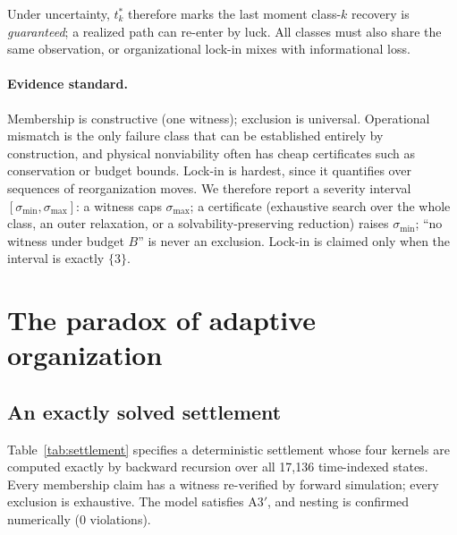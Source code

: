\documentclass[11pt]{article}
\theoremstyle{plain}
\theoremstyle{definition}
\begin{document}
Under uncertainty, $t^*_k$ therefore marks the last moment class-$k$ recovery is \emph{guaranteed}; a realized path can re-enter by luck. All classes must also share the same observation, or organizational lock-in mixes with informational loss.

\paragraph{Evidence standard.} Membership is constructive (one witness); exclusion is universal. Operational mismatch is the only failure class that can be established entirely by construction, and physical nonviability often has cheap certificates such as conservation or budget bounds. Lock-in is hardest, since it quantifies over sequences of reorganization moves. We therefore report a severity interval $[\sigma_{\min},\sigma_{\max}]$: a witness caps $\sigma_{\max}$; a certificate (exhaustive search over the whole class, an outer relaxation, or a solvability-preserving reduction) raises $\sigma_{\min}$; ``no witness under budget $B$'' is never an exclusion. Lock-in is claimed only when the interval is exactly $\{3\}$.

\section{The paradox of adaptive organization}
\label{sec:paradox}

\subsection{An exactly solved settlement}

Table~\ref{tab:settlement} specifies a deterministic settlement whose four kernels are computed exactly by backward recursion over all 17,136 time-indexed states. Every membership claim has a witness re-verified by forward simulation; every exclusion is exhaustive. The model satisfies A3$'$, and nesting is confirmed numerically (0 violations).
\end{document}
